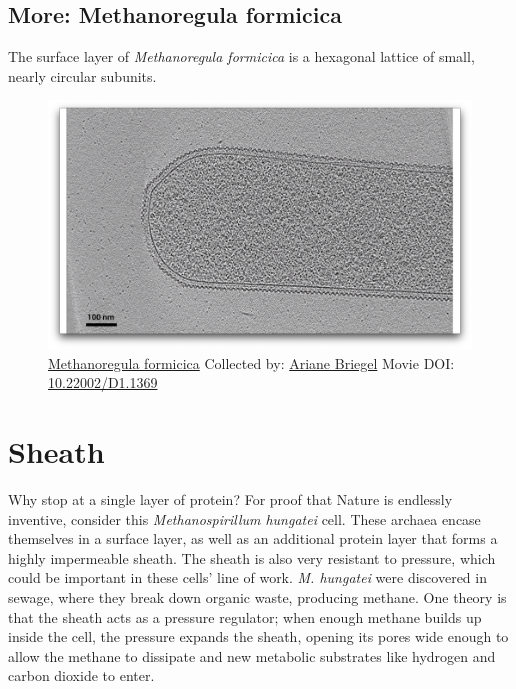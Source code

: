 \documentclass[]{tufte-book}
\begin{document}
\hypertarget{Methanoregula_formicica}{\subsection*{More: Methanoregula
formicica}\label{Methanoregula_formicica}}

The surface layer of \emph{Methanoregula formicica} is a hexagonal
lattice of small, nearly circular subunits.





\begin{figure}
\includegraphics{movie_stills/2_7d} \caption[\protect\hyperlink{tree}{Methanoregula formicica} Collected
by: \protect\hyperlink{ariane_briegel}{Ariane Briegel} Movie DOI:
\href{https://doi.org/10.22002/D1.1369}{10.22002/D1.1369}]{\protect\hyperlink{tree}{Methanoregula formicica} Collected
by: \protect\hyperlink{ariane_briegel}{Ariane Briegel} Movie DOI:
\href{https://doi.org/10.22002/D1.1369}{10.22002/D1.1369}}\label{fig:2-7d}
\end{figure}

\section{Sheath}\label{sheath}

Why stop at a single layer of protein? For proof that Nature is
endlessly inventive, consider this \emph{Methanospirillum hungatei}
cell. These archaea encase themselves in a surface layer, as well as an
additional protein layer that forms a highly impermeable sheath. The
sheath is also very resistant to pressure, which could be important in
these cells' line of work. \emph{M. hungatei} were discovered in sewage,
where they break down organic waste, producing methane. One theory is
that the sheath acts as a pressure regulator; when enough methane builds
up inside the cell, the pressure expands the sheath, opening its pores
wide enough to allow the methane to dissipate and new metabolic
substrates like hydrogen and carbon dioxide to enter.
\end{document}
